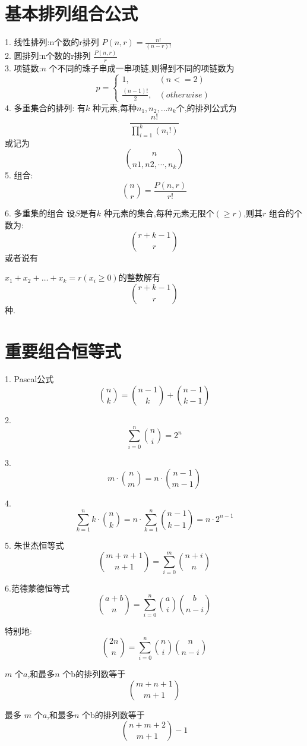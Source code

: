 \section{基本排列组合公式}
1. 线性排列:n个数的r排列 $P(n,r)=\frac{n!}{(n-r)!}$\\
2. 圆排列:n个数的r排列 $\frac{P(n,r)}{r}$\\
3. 项链数:$n$ 个不同的珠子串成一串项链,则得到不同的项链数为
$$
p=\begin{cases}
  1,& \left( n<=2\right) \\
  \frac{(n-1)!}{2},& \left( otherwise\right)
  \end{cases}
$$
4. 多重集合的排列: 有$k$ 种元素,每种$n_1,n_2,\dots n_k$个,的排列公式为
$$
\frac{n!}{\prod_{i=1}^{k}\left(n_i!\right)} 
$$
或记为
$$
\binom{n}{n1,n2,\cdots,n_k} 
$$
5. 组合: 
$$
\binom{n}{r}=\frac{P(n,r)}{r!} 
$$

6. 多重集的组合
设$S$是有$k$ 种元素的集合,每种元素无限个$(\geq r)$,则其$r$ 组合的个数为:
$$
\binom{r+k-1}{r} 
$$
或者说有
\begin{proposition}
$x_1+x_2+\dots+x_k=r(x_i\geq 0)$的整数解有
$$
\binom{r+k-1}{r} 
$$
种.
\end{proposition}


\section{重要组合恒等式}
1. Pascal公式
$$
\binom{n}{k}=\binom{n-1}{k}+\binom{n-1}{k-1} 
$$

2.
$$
\sum_{i=0}^{n} \binom{n}{i}=2^n 
$$

3. 
$$
 m\cdot \binom{n}{m}=n\cdot \binom{n-1}{m-1}
$$

4.
$$ 
\sum_{k=1}^{n} k\cdot\binom{n}{k}=n\cdot \sum_{k=1}^{n}\binom{n-1}{k-1}=n\cdot2^{n-1} 
$$

5. 朱世杰恒等式
$$
\binom{m+n+1}{n+1}=\sum_{i=0}^{m} \binom{n+i}{n}
$$

6.范德蒙德恒等式
$$
\binom{a+b}{n}=\sum_{i=0}^{n}\binom{a}{i}\binom{b}{n-i}
$$

特别地:
$$
\binom{2n}{n}=\sum_{i=0}^{n}\binom{n}{i}\binom{n}{n-i}
$$

\begin{proposition}
$m$ 个$a$,和最多$n$ 个b的排列数等于
$$
\binom{m+n+1}{m+1} 
$$
\end{proposition}

\begin{proposition}
  最多 $m$ 个$a$,和最多$n$ 个b的排列数等于
  $$
  \binom{n+m+2}{m+1}-1
  $$
\end{proposition}

